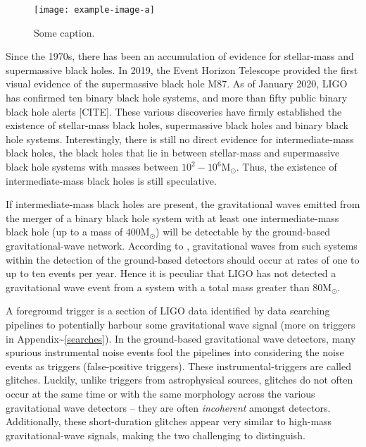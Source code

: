 \documentclass[%
 reprint,
 amsmath,amssymb,
 aps,
]{revtex4-2}
\begin{document}
\begin{figure}
    \centering
    \texttt{[image: example-image-a]}
    \caption{Some caption.}
    \label{fig:somefig}
\end{figure}

Since the 1970s, there has been an accumulation of evidence for stellar-mass and supermassive black holes. In 2019, the Event Horizon Telescope provided the first visual evidence of the supermassive black hole M87.  As of January 2020, LIGO has confirmed ten binary black hole systems, and more than fifty public binary black hole alerts [CITE]. These various discoveries have firmly established the existence of stellar-mass black holes, supermassive black holes and binary black hole systems.  Interestingly, there is still no direct evidence for intermediate-mass black holes, the black holes that lie in between stellar-mass and supermassive black hole systems with masses between $10^2-10^6 \text{M}_\odot$. Thus, the existence of intermediate-mass black holes is still speculative. 

If intermediate-mass black holes are present, the gravitational waves emitted from the merger of a binary black hole system with at least one intermediate-mass black hole (up to a mass of $400 \text{M}_\odot$) will be detectable by the ground-based gravitational-wave network. According to \citet{fregeau2006imbhbRatePrediction, mandel2008rates,rodriguez2015bbhRatePredictions}, gravitational waves from such systems within the detection of the ground-based detectors should occur at rates of one to up to ten events per year.  Hence it is peculiar that LIGO has not detected a gravitational wave event from a system with a total mass greater than $80 \text{M}_\odot$. 

A foreground trigger is a section of LIGO data identified by data searching pipelines to potentially harbour some
gravitational wave signal (more on triggers in Appendix\textasciitilde\ref{searches}). In the ground-based gravitational wave
detectors, many spurious instrumental noise events fool the pipelines into considering the noise events as triggers
(false-positive triggers). These instrumental-triggers are called glitches. Luckily, unlike triggers from astrophysical
sources, glitches do not often occur at the same time or with the same morphology across the various gravitational wave
detectors -- they are often \emph{incoherent} amongst detectors. Additionally, these short-duration glitches appear very
similar to high-mass gravitational-wave signals, making the two challenging to distinguish.
\end{document}
